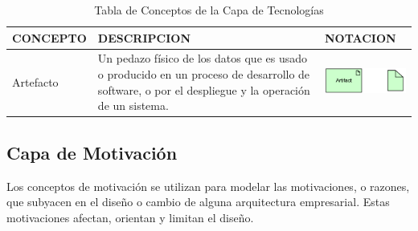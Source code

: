\begin{table}[H]
	\centering
	\begin{tabular}{| m{4cm} | m{4cm} | m{4cm} | }
		\hline
		\centering\vspace{1.52mm}CONCEPTO & \centering\vspace{1.52mm}DESCRIPCION &\vspace{1.52mm}NOTACION \\
		\hline
		\centering\vspace{1.52mm}Artefacto & \vspace{1.52mm}Un pedazo físico de los datos que es usado o producido en un proceso de desarrollo de software, o por el despliegue y la operación de un sistema.& \vspace{1.52mm}\includegraphics[width=40mm]{arquitectura/imagenes/39} \\
		\hline
	\end{tabular}
	\caption{Tabla de Conceptos de la Capa de Tecnologías}
	\label{fig:tecnologias}
\end{table}

\subsection{Capa de Motivación}

Los conceptos de motivación se utilizan para modelar las motivaciones, o razones, que subyacen en el diseño o cambio de alguna arquitectura empresarial. Estas motivaciones afectan, orientan y limitan el diseño.


